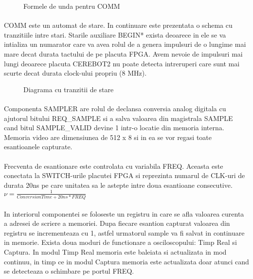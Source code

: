 \begin{figure}[h]
\centering
\setlength\fboxsep{0pt}
\setlength\fboxrule{0.5pt}
\caption{Formele de unda pentru COMM}
\label{fig:waveform-COMM}
\end{figure}
\clearpage

\paragraph{}
COMM este un automat de stare. In continuare este prezentata o schema cu tranzitiile intre stari. Starile auxiliare BEGIN* exista deoarece in ele se va intializa un numarator care va avea rolul de a genera impulsuri de o lungime mai mare decat durata tactului de pe placuta FPGA. Avem nevoie de impulsuri mai lungi deoarece placuta CEREBOT2 nu poate detecta intreruperi care sunt mai scurte decat durata clock-ului propriu (8 MHz).

\begin{figure}[h]
\centering
\setlength\fboxsep{0pt}
\setlength\fboxrule{0.5pt}
\caption{Diagrama cu tranzitii de stare}
\label{fig:COMM-automata}
\end{figure}
\clearpage


\paragraph{}
Componenta SAMPLER are rolul de declansa conversia analog digitala cu ajutorul bitului REQ\_SAMPLE si a salva valoarea din magistrala SAMPLE cand bitul SAMPLE\_VALID devine 1 intr-o locatie din memoria interna. Memoria video are dimensiunea de 512 x 8 si in ea se vor regasi toate esantioanele capturate. 

\paragraph{}
Frecventa de esantionare este controlata cu variabila FREQ. Aceasta este conectata la SWITCH-urile placutei FPGA si reprezinta numarul de CLK-uri de durata 20ns pe care unitatea sa le astepte intre doua esantioane consecutive.
\(\nu = \frac{1}{ConversionTime + 20ns * FREQ}\)


\paragraph{}
In interiorul componentei se foloseste un registru in care se afla valoarea curenta a adresei de scriere a memoriei. Dupa fiecare esantion capturat valoarea din registru se incrementeaza cu 1, astfel urmatorul sample va fi salvat in continuare in memorie. Exista doua moduri de functionare a osciloscopului: Timp Real si Captura. In modul Timp Real memoria este baleiata si actualizata in mod continuu, in timp ce in modul Captura memoria este actualizata doar atunci cand se detecteaza o schimbare pe portul FREQ.


